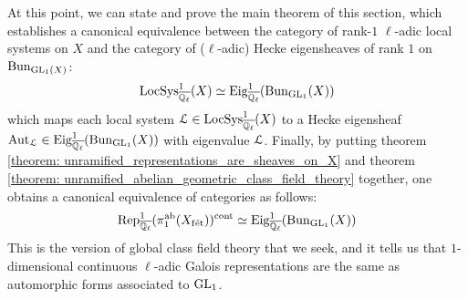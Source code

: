         At this point, we can state and prove the main theorem of this section, which establishes a canonical equivalence between the category of rank-$1$ $\ell$-adic local systems on $X$ and the category of ($\ell$-adic) Hecke eigensheaves of rank $1$ on $\mathrm{Bun}_{\operatorname{GL}_1(X)}$:
            $$\mathrm{LocSys}_{\overline{\mathbb{Q}_{\ell}}}^1(X) \simeq \mathrm{Eig}^1_{\overline{\mathbb{Q}_{\ell}}}(\mathrm{Bun}_{\operatorname{GL}_1}(X))$$
        which maps each local system $\mathcal{L} \in \mathrm{LocSys}_{\overline{\mathbb{Q}_{\ell}}}^1(X)$ to a Hecke eigensheaf $\mathrm{Aut}_{\mathcal{L}} \in \mathrm{Eig}^1_{\overline{\mathbb{Q}_{\ell}}}(\mathrm{Bun}_{\operatorname{GL}_1}(X))$ with eigenvalue $\mathcal{L}$. Finally, by putting theorem \ref{theorem: unramified_representations_are_sheaves_on_X} and theorem \ref{theorem: unramified_abelian_geometric_class_field_theory} together, one obtains a canonical equivalence of categories as follows:
            $$\mathrm{Rep}_{\overline{\mathbb{Q}_{\ell}}}^1(\pi_1^{\mathrm{ab}}(X_{\mathrm{f\acute{e}t}}))^{\mathrm{cont}} \simeq \mathrm{Eig}^1_{\overline{\mathbb{Q}_{\ell}}}(\mathrm{Bun}_{\operatorname{GL}_1}(X))$$
        This is the version of global class field theory that we seek, and it tells us that $1$-dimensional continuous $\ell$-adic Galois representations are the same as automorphic forms associated to $\operatorname{GL}_1$.
        